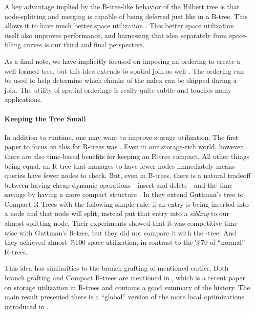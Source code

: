A key advantage implied by the B-tree-like behavior of the Hilbert tree is that node-splitting and merging is capable of being deferred just like in a B-tree.
This allows it to have much better space utilization \cite{kamelfaloutsos94}.
This better space utilization itself also improves performance, and harnessing that idea separately from space-filling curves is our third and final perspective.

As a final note, we have implicitly focused on imposing an ordering to create a well-formed tree, but this idea extends to spatial join as well \cite{jacoxsamet07}.
The ordering can be used to help determine which chunks of the index can be skipped during a join.
The utility of spatial orderings is really quite subtle and touches many applications.

\paragraph{Keeping the Tree Small}
In addition to runtime, one may want to improve storage utilization.
The first paper to focus on this for R-trees was \cite{huanglinlin01}.
Even in our storage-rich world, however, there are also time-based benefits for keeping an R-tree compact.
All other things being equal, an R-tree that manages to have fewer nodes immediately means queries have fewer nodes to check.
But, even in B-trees, there is a natural tradeoff between having cheap dynamic operations---insert and delete---and the time savings by having a more compact structure \cite{tocite}.
In \cite{huanglinlin01} they extend Guttman's tree to Compact R-Trees with the following simple rule: if an entry is being inserted into a node and that node will split, instead put that entry into a \emph{sibling} to our almost-splitting node.
Their experiments showed that it was competitive time-wise with Guttman's R-tree, but they did not compare it with the \rstar-tree.
And they achieved almost \%100 space utilization, in contrast to the \%70 of ``normal'' R-trees.

This idea has similarities to the branch grafting of \cite{schrekchen00} mentioned earlier.
Both branch grafting and Compact R-trees are mentioned in \cite{zhanglucheng06}, which is a recent paper on storage utilization in R-trees and contains a good summary of the history.
The main result presented there is a ``global'' version of the more local optimizations introduced in \cite{huanglinlin01}.
